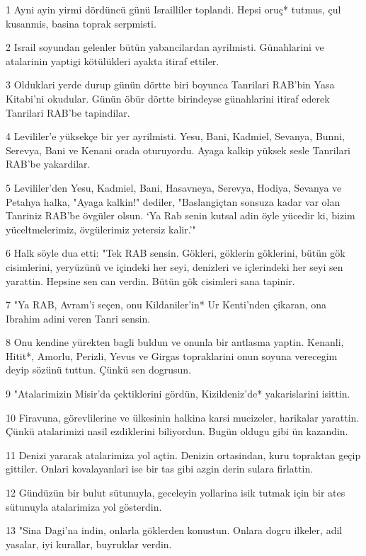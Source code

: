 \par 1 Ayni ayin yirmi dördüncü günü Israilliler toplandi. Hepsi oruç* tutmus, çul kusanmis, basina toprak serpmisti.
\par 2 Israil soyundan gelenler bütün yabancilardan ayrilmisti. Günahlarini ve atalarinin yaptigi kötülükleri ayakta itiraf ettiler.
\par 3 Olduklari yerde durup günün dörtte biri boyunca Tanrilari RAB'bin Yasa Kitabi'ni okudular. Günün öbür dörtte birindeyse günahlarini itiraf ederek Tanrilari RAB'be tapindilar.
\par 4 Levililer'e yüksekçe bir yer ayrilmisti. Yesu, Bani, Kadmiel, Sevanya, Bunni, Serevya, Bani ve Kenani orada oturuyordu. Ayaga kalkip yüksek sesle Tanrilari RAB'be yakardilar.
\par 5 Levililer'den Yesu, Kadmiel, Bani, Hasavneya, Serevya, Hodiya, Sevanya ve Petahya halka, "Ayaga kalkin!" dediler, "Baslangiçtan sonsuza kadar var olan Tanriniz RAB'be övgüler olsun. `Ya Rab senin kutsal adin öyle yücedir ki, bizim yüceltmelerimiz, övgülerimiz yetersiz kalir.'"
\par 6 Halk söyle dua etti: "Tek RAB sensin. Gökleri, göklerin göklerini, bütün gök cisimlerini, yeryüzünü ve içindeki her seyi, denizleri ve içlerindeki her seyi sen yarattin. Hepsine sen can verdin. Bütün gök cisimleri sana tapinir.
\par 7 "Ya RAB, Avram'i seçen, onu Kildaniler'in* Ur Kenti'nden çikaran, ona Ibrahim adini veren Tanri sensin.
\par 8 Onu kendine yürekten bagli buldun ve onunla bir antlasma yaptin. Kenanli, Hitit*, Amorlu, Perizli, Yevus ve Girgas topraklarini onun soyuna verecegim deyip sözünü tuttun. Çünkü sen dogrusun.
\par 9 "Atalarimizin Misir'da çektiklerini gördün, Kizildeniz'de* yakarislarini isittin.
\par 10 Firavuna, görevlilerine ve ülkesinin halkina karsi mucizeler, harikalar yarattin. Çünkü atalarimizi nasil ezdiklerini biliyordun. Bugün oldugu gibi ün kazandin.
\par 11 Denizi yararak atalarimiza yol açtin. Denizin ortasindan, kuru topraktan geçip gittiler. Onlari kovalayanlari ise bir tas gibi azgin derin sulara firlattin.
\par 12 Gündüzün bir bulut sütunuyla, geceleyin yollarina isik tutmak için bir ates sütunuyla atalarimiza yol gösterdin.
\par 13 "Sina Dagi'na indin, onlarla göklerden konustun. Onlara dogru ilkeler, adil yasalar, iyi kurallar, buyruklar verdin.
